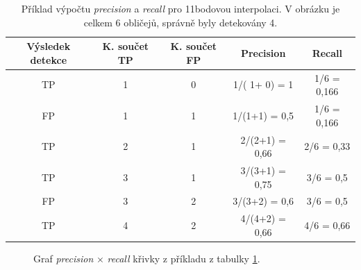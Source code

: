 \begin{table}[H]
  \begin{tabular}{|c|c|c|c|c|}
  \hline
  \rowcolor[HTML]{E0DBDB} 
  \textbf{Výsledek detekce} & \textbf{K. součet TP} & \textbf{K. součet FP} & \textbf{Precision} & \textbf{Recall} \\ \hline
  TP         & {\color[HTML]{3531FF} 1} & {\color[HTML]{FE0000} 0} & {\color[HTML]{3531FF} 1}/({\color[HTML]{3531FF} 1}+{\color[HTML]{FE0000} 0}) = 1 & {\color[HTML]{3531FF} 1}/6 = 0,166     \\ \hline
  FP    & 1   & 1     & 1/(1+1) = 0,5    & 1/6 = 0,166 \\ \hline
  TP   & 2    & 1   & 2/(2+1) = 0,66   & 2/6 = 0,33      \\ \hline
  TP    & 3    & 1   & 3/(3+1) = 0,75     & 3/6 = 0,5       \\ \hline
  FP   & 3     & 2     & 3/(3+2) = 0,6     & 3/6 = 0,5       \\ \hline
  TP  & 4    & 2   & 4/(4+2) = 0,66  & 4/6 = 0,66    \\ \hline
  \end{tabular}
  \label{tabulka:prkrivka}
  \caption{Příklad výpočtu \emph{precision} a \emph{recall} pro 11bodovou interpolaci. V obrázku je celkem 6 obličejů, správně byly detekovány 4.}
\end{table}

\begin{figure}[H] 
  \begin{center}
  \label{obrazek:prkrivka}
  \caption{Graf \emph{precision} $\times$ \emph{recall} křivky z příkladu z tabulky \ref{tabulka:prkrivka}.}
  \end{center}
\end{figure}

